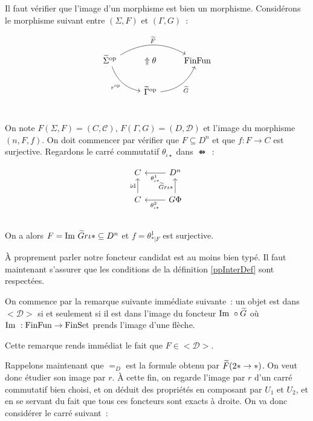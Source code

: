 \begin{pv}
    Il faut vérifier que l'image d'un morphisme est bien un morphisme. Considérons le
    morphisme suivant entre $(\Sigma,F)$ et $(\Gamma,G)$~:

    \[\begin{tikzcd}
        \tsigma^\op\arrow[dr, bend right, swap, "r^\op"]\arrow[rr, bend left, "\tf"]
            & \Uparrow\theta
            & \ffun \\
        & \tgamma^\op\arrow[ur, bend right, swap, "\tg"] \\
    \end{tikzcd}\]

    On note $F(\Sigma,F) = (C,\mathscr{C})$, $F(\Gamma,G) = (D,\mathscr{D})$ et l'image
    du morphisme $(n, F, f)$. On doit commencer par vérifier que $F\subseteq D^n$ et
    que $f : F\rightarrow C$ est surjective. Regardons le carré commutatif
    $\theta_{\iota\star}$ dans $\ffun$~:

    \[\begin{tikzcd}
        C & D^n\arrow[l, "\theta^1_{\iota\ast}"] \\
        C\arrow[u, "\id"]
            & G\Phi\arrow[u, "\tg r\iota\ast"]\arrow[l, "\theta^2_{\iota\ast}"] \\
    \end{tikzcd}\]

    On a alors $F = \text{Im }\widetilde{G} r\iota\ast\subseteq D^n$ et $f = \theta^1_{\ast|F}$ est
    surjective.

    À proprement parler notre foncteur candidat est au moins bien typé. Il faut
    maintenant s'assurer que les conditions de la définition \ref{ppInterDef}
    sont respectées.

    On commence par la remarque suivante immédiate suivante~: un objet est dans
    $<\mathscr{D}>$ si et seulement si il est dans l'image du foncteur
    $\text{Im }\circ\widetilde{G}$ où $\text{Im }:\text{FinFun}\rightarrow\text{FinSet}$ prends l'image d'une flèche.

    Cette remarque rends immédiat le fait que $F\in<\mathscr{D}>$.

    Rappelons maintenant que $=_D$ est la formule obtenu par $\widetilde{F}(2\ast\rightarrow\ast)$.
    On veut donc étudier son image par $r$. À cette fin, on regarde l'image par
    $r$ d'un carré commutatif bien choisi, et on déduit des propriétés en composant par
    $U_1$ et $U_2$, et en se servant du fait que tous ces foncteurs sont exacts à droite.
    On va donc considérer le carré suivant~:


\end{pv}
